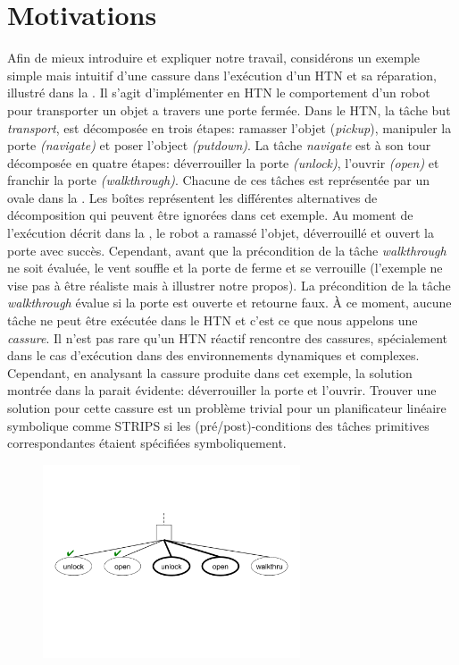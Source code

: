 \documentclass[a4paper,twoside,french]{article}
\begin{document}
		\section{Motivations}
		\label{sec:motivation}
		Afin de mieux introduire et expliquer notre travail, considérons un exemple simple mais intuitif d'une cassure dans l'exécution d'un HTN et sa réparation, illustré dans la  . Il s'agit d'implémenter en HTN le comportement d'un robot pour transporter un objet a travers une porte fermée. Dans le HTN, la tâche but {\em transport}, est décomposée en trois étapes: ramasser l'objet ({\em pickup}), manipuler la porte {\em(navigate)} et poser l'object {\em(putdown)}. La tâche {\em navigate} est à son tour décomposée en quatre étapes: déverrouiller  la porte {\em(unlock)}, l'ouvrir {\em(open)} et franchir la porte {\em(walkthrough)}. Chacune de ces tâches est représentée par un ovale dans la . Les boîtes représentent les différentes alternatives de décomposition qui peuvent être ignorées dans cet exemple. Au moment de l'exécution décrit dans la , le robot a ramassé l'objet, déverrouillé et ouvert la porte avec succès. Cependant, avant que la précondition de la tâche {\em walkthrough} ne soit évaluée, le vent souffle et la porte de ferme et se verrouille (l'exemple ne vise pas à être réaliste mais à illustrer notre propos). La précondition de la tâche {\em walkthrough} évalue si la porte est ouverte et retourne faux. À ce moment, aucune tâche ne peut être exécutée dans le HTN et c'est ce que nous appelons une {\em cassure}. Il n'est pas rare qu'un HTN réactif rencontre des cassures, spécialement dans le cas d'exécution dans des environnements dynamiques et complexes. Cependant, en analysant la cassure produite dans cet exemple, la solution montrée dans la  parait évidente: déverrouiller la porte et l'ouvrir. Trouver une solution pour cette cassure est un problème trivial pour un planificateur linéaire symbolique comme STRIPS si les (pré/post)-conditions des tâches primitives correspondantes étaient spécifiées symboliquement.
					\begin{figure}[t]
						\centerline{\includegraphics[width=3in]{figs/recover}}
						\vskip 8pt
					\end{figure}
		
\end{document}
